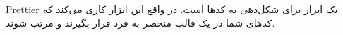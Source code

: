 Prettier یک ابزار برای شکل‌دهی به کدها است. در واقع این ابزار کاری می‌کند که کدهای شما در یک قالب منحصر به فرد قرار بگیرند و مرتب شوند. 